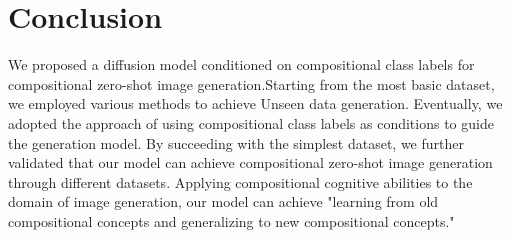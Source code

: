 \chapter{Conclusion}
\label{chapter:conclusion}
We proposed a diffusion model conditioned on compositional class labels for compositional zero-shot image generation.Starting from the most basic dataset, we employed various methods to achieve Unseen data generation. Eventually, we adopted the approach of using compositional class labels as conditions to guide the generation model. By succeeding with the simplest dataset, we further validated that our model can achieve compositional zero-shot image generation through different datasets. Applying compositional cognitive abilities to the domain of image generation, our model can achieve "learning from old compositional concepts and generalizing to new compositional concepts."

